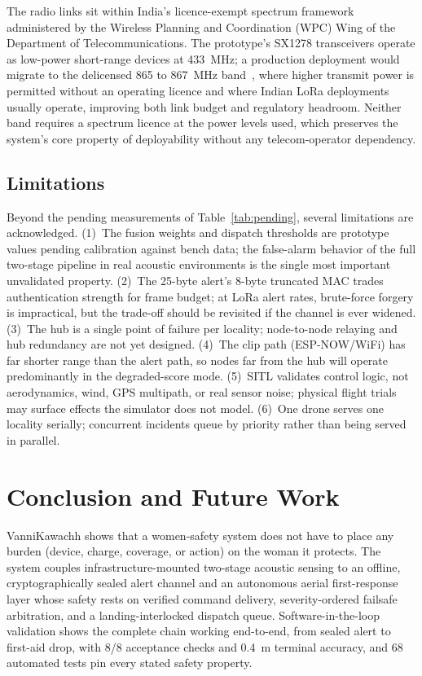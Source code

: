 \documentclass[journal]{IEEEtran}
\begin{document}
The radio links sit within India's licence-exempt spectrum framework
administered by the Wireless Planning and Coordination (WPC) Wing of the
Department of Telecommunications. The prototype's SX1278 transceivers
operate as low-power short-range devices at 433~MHz; a production deployment
would migrate to the delicensed 865 to 867~MHz band~\cite{wpc865}, where
higher transmit power is permitted without an operating licence and where
Indian LoRa deployments usually operate, improving both link budget
and regulatory headroom. Neither band requires a spectrum licence at the
power levels used, which preserves the system's core property of
deployability without any telecom-operator dependency.

\subsection{Limitations}

Beyond the pending measurements of Table~\ref{tab:pending}, several
limitations are acknowledged. (1)~The fusion weights and dispatch thresholds
are prototype values pending calibration against bench data; the false-alarm
behavior of the full two-stage pipeline in real acoustic environments is
the single most important unvalidated property. (2)~The 25-byte alert's
8-byte truncated MAC trades authentication strength for frame budget; at
LoRa alert rates, brute-force forgery is impractical, but the trade-off
should be revisited if the channel is ever widened. (3)~The hub is a single
point of failure per locality; node-to-node relaying and hub redundancy are
not yet designed. (4)~The clip path (ESP-NOW/WiFi) has far shorter range
than the alert path, so nodes far from the hub will operate predominantly in
the degraded-score mode. (5)~SITL validates control logic, not aerodynamics,
wind, GPS multipath, or real sensor noise; physical flight trials may
surface effects the simulator does not model. (6)~One drone serves one
locality serially; concurrent incidents queue by priority rather than being
served in parallel.

\section{Conclusion and Future Work}
\label{sec:conclusion}

VanniKawachh shows that a women-safety system does not have to place any
burden (device, charge, coverage, or action) on the woman it protects. The
system couples infrastructure-mounted two-stage acoustic sensing to an
offline, cryptographically sealed alert channel and an autonomous aerial
first-response layer whose safety rests on verified command delivery,
severity-ordered failsafe arbitration, and a landing-interlocked dispatch
queue. Software-in-the-loop validation shows the complete chain working
end-to-end, from sealed alert to first-aid drop, with 8/8 acceptance
checks and 0.4~m terminal accuracy, and 68 automated tests pin every stated
safety property.
\end{document}

